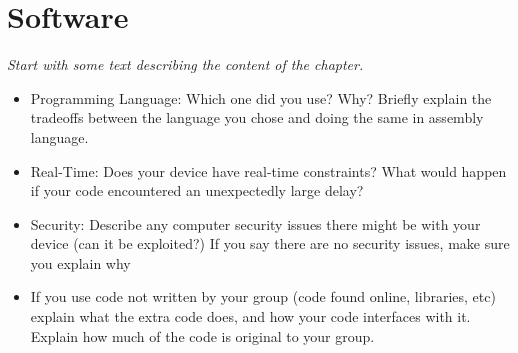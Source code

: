 \section{Software}
\emph{Start with some text describing the content of the chapter.}\\


\begin{itemize}
    \item Programming Language:  Which one did you use? Why? Briefly explain the tradeoffs between the language you chose and doing the same in assembly language.
    \item Real-Time: Does your device have real-time constraints? What would happen if your code encountered an unexpectedly large delay?
    \item Security: Describe any computer security issues there might be with your device (can it be exploited?) If you say there are no security issues, make sure you explain why
    \item If you use code not written by your group (code found online, libraries, etc) explain what the extra code does, and how your code interfaces with it. Explain how much of the code is original to your group.

\end{itemize}
